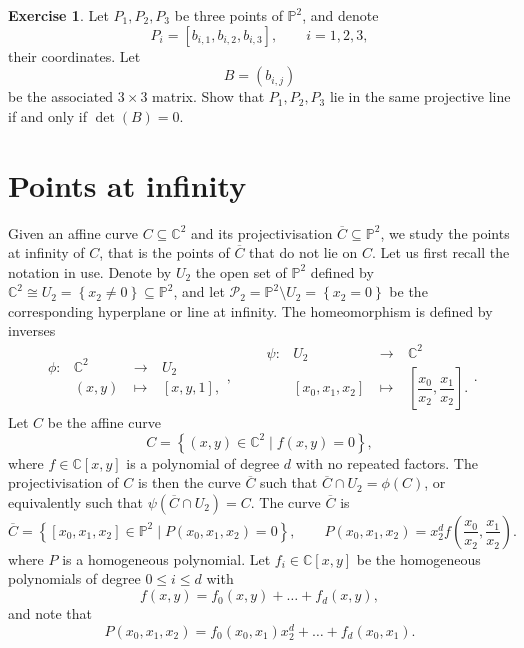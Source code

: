 \documentclass{article}
\newcommand{\C}{\mathbb{C}}
\renewcommand{\P}{\mathbb{P}}
\newcommand{\rb}[1]{\left( #1 \right)}
\renewcommand{\sb}[1]{\left[ #1 \right]}
\newcommand{\cb}[1]{\left\{ #1 \right\}}
\theoremstyle{definition}\newtheorem{definition}{Definition}[section]
\theoremstyle{definition}\newtheorem{notation}[definition]{Notation}
\theoremstyle{definition}\newtheorem{remark}[definition]{Remark}
\theoremstyle{definition}\newtheorem{example1}[definition]{Example}
\theoremstyle{definition}\newtheorem{fact}{Fact}
\theoremstyle{definition}\newtheorem{exercise}{Exercise}
\theoremstyle{definition}\newtheorem*{example2}{Example}
\begin{document}
\begin{exercise}
\label{ex:19}
Let $ P_1, P_2, P_3 $ be three points of $ \P^2 $, and denote
$$ P_i = \sb{b_{i, 1}, b_{i, 2}, b_{i, 3}}, \qquad i = 1, 2, 3, $$
their coordinates. Let
$$ B = \rb{b_{i, j}} $$
be the associated $ 3 \times 3 $ matrix. Show that $ P_1, P_2, P_3 $ lie in the same projective line if and only if $ \det\rb{B} = 0 $.
\end{exercise}

\pagebreak

\section{Points at infinity}

Given an affine curve $ C \subseteq \C^2 $ and its projectivisation $ \overline{C} \subseteq \P^2 $, we study the points at infinity of $ C $, that is the points of $ \overline{C} $ that do not lie on $ C $. Let us first recall the notation in use. Denote by $ U_2 $ the open set of $ \P^2 $ defined by $ \C^2 \cong U_2 = \cb{x_2 \ne 0} \subseteq \P^2 $, and let $ \mathcal{P}_2 = \P^2 \setminus U_2 = \cb{x_2 = 0} $ be the corresponding hyperplane or line at infinity. The homeomorphism is defined by inverses
$$
\begin{array}{cccc}
\phi : & \C^2 & \ \to \ & U_2 \\
& \rb{x, y} & \ \mapsto \ & \sb{x, y, 1},
\end{array},
\qquad
\begin{array}{cccc}
\psi : & U_2 & \ \to \ & \C^2 \\
& \sb{x_0, x_1, x_2} & \ \mapsto \ & \sb{\dfrac{x_0}{x_2}, \dfrac{x_1}{x_2}}.
\end{array}.
$$
Let $ C $ be the affine curve
$$ C = \cb{\rb{x, y} \in \C^2 \mid f\rb{x, y} = 0}, $$
where $ f \in \C\sb{x, y} $ is a polynomial of degree $ d $ with no repeated factors. The projectivisation of $ C $ is then the curve $ \overline{C} $ such that $ \overline{C} \cap U_2 = \phi\rb{C} $, or equivalently such that $ \psi\rb{\overline{C} \cap U_2} = C $. The curve $ \overline{C} $ is
$$ \overline{C} = \cb{\sb{x_0, x_1, x_2} \in \P^2 \mid P\rb{x_0, x_1, x_2} = 0}, \qquad P\rb{x_0, x_1, x_2} = x_2^df\rb{\dfrac{x_0}{x_2}, \dfrac{x_1}{x_2}}. $$
where $ P $ is a homogeneous polynomial. Let $ f_i \in \C\sb{x, y} $ be the homogeneous polynomials of degree $ 0 \le i \le d $ with
$$ f\rb{x, y} = f_0\rb{x, y} + \dots + f_d\rb{x, y}, $$
and note that
\begin{equation}
\label{eq:4}
P\rb{x_0, x_1, x_2} = f_0\rb{x_0, x_1}x_2^d + \dots + f_d\rb{x_0, x_1}.
\end{equation}
\end{document}
